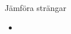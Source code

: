 

\ifkompendium\else

\begin{Slide}{Jämföra strängar}\SlideFontSmall
\begin{itemize}
\item 
\end{itemize}

\end{Slide}


\fi











